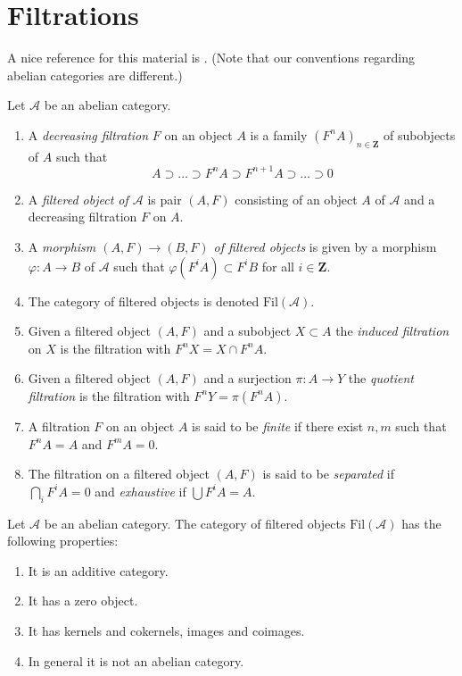 \section{Filtrations}
\label{section-filtrations}

\noindent
A nice reference for this material is \cite[Section 1]{HodgeII}.
(Note that our conventions regarding abelian categories are different.)

\begin{definition}
\label{definition-filtered}
Let $\mathcal{A}$ be an abelian category.
\begin{enumerate}
\item A {\it decreasing filtration} $F$ on an object $A$
is a family $(F^nA)_{n \in \mathbf{Z}}$ of subobjects of $A$ such that
$$
A \supset \ldots \supset F^nA \supset F^{n + 1}A \supset \ldots \supset 0
$$
\item A {\it filtered object of $\mathcal{A}$} is
pair $(A, F)$ consisting of an object $A$ of $\mathcal{A}$
and a decreasing filtration $F$ on $A$.
\item A {\it morphism $(A, F) \to (B, F)$ of filtered objects}
is given by a morphism $\varphi : A \to B$ of $\mathcal{A}$
such that $\varphi(F^iA) \subset F^iB$ for all $i \in \mathbf{Z}$.
\item The category of filtered objects is denoted $\text{Fil}(\mathcal{A})$.
\item Given a filtered object $(A, F)$ and a subobject $X \subset A$ the
{\it induced filtration} on $X$ is the filtration with $F^nX = X \cap F^nA$.
\item Given a filtered object $(A, F)$ and a surjection
$\pi : A \to Y$ the {\it quotient filtration} is the filtration with
$F^nY = \pi(F^nA)$.
\item A filtration $F$ on an object $A$ is said to be {\it finite}
if there exist $n, m$ such that $F^nA = A$ and $F^mA = 0$.
\item  The filtration on a filtered object $(A, F)$ is said to be
{\it separated} if $\bigcap_i F^iA = 0$ and
{\it exhaustive} if $\bigcup F^iA = A$.
\end{enumerate}
\end{definition}

\begin{lemma}
\label{lemma-filtered}
Let $\mathcal{A}$ be an abelian category.
The category of filtered objects $\text{Fil}(\mathcal{A})$
has the following properties:
\begin{enumerate}
\item It is an additive category.
\item It has a zero object.
\item It has kernels and cokernels, images and coimages.
\item In general it is not an abelian category.
\end{enumerate}
\end{lemma}

